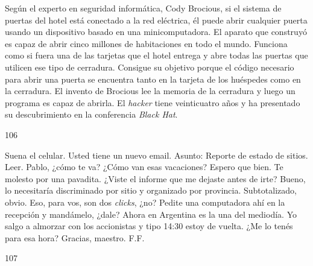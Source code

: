\documentclass[12pt,twoside,openright,a5paper]{book}
\begin{document}
Según el experto en seguridad informática, Cody Brocious, si el sistema
de puertas del hotel está conectado a la red eléctrica, él puede abrir
cualquier puerta usando un dispositivo basado en una minicomputadora.
El aparato que construyó es capaz de abrir cinco millones de
habitaciones en todo el mundo.
Funciona como si fuera una de las tarjetas que el hotel entrega
y abre todas las puertas que utilicen ese tipo de cerradura. Consigue su
objetivo porque el código necesario para abrir una puerta se encuentra
tanto en la tarjeta de los huéspedes como en la cerradura. El invento de
Brocious lee la memoria de la cerradura y luego un programa es capaz de
abrirla. El \emph{hacker} tiene veinticuatro años y ha presentado su descubrimiento en la
conferencia \emph{Black Hat}.

\vspace{0.5cm}

\hrulefill \hspace{0.1cm}\decofourleft\hspace{0.2cm} 106 \hspace{0.2cm}\decofourright \hspace{0.1cm}\hrulefill

\nopagebreak

\vspace{0.5cm}

\nopagebreak

Suena el celular. Usted tiene un nuevo email. Asunto: Reporte de estado de sitios. Leer. Pablo, ¿cómo te va? 
¿Cómo van esas vacaciones? Espero que bien.
Te molesto por una pavadita. ¿Viste el informe que me dejaste antes de irte?
Bueno, lo necesitaría discriminado por sitio y organizado por provincia.
Subtotalizado, obvio. Eso, para vos, son dos \emph{clicks}, ¿no?
Pedite una computadora ahí en la recepción y mandámelo, ¿dale? Ahora en
Argentina es la una del mediodía. Yo salgo a almorzar con los accionistas
y tipo 14:30 estoy de vuelta. ¿Me lo tenés para esa hora?
Gracias, maestro.
F.F.

\vspace{0.5cm}

\hrulefill \hspace{0.1cm}\decofourleft\hspace{0.2cm} 107 \hspace{0.2cm}\decofourright \hspace{0.1cm}\hrulefill

\nopagebreak

\vspace{0.5cm}
\end{document}
